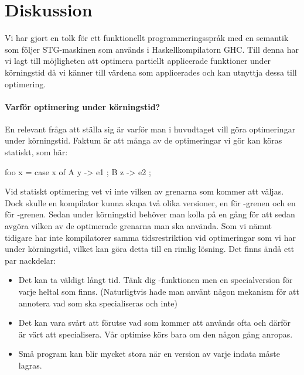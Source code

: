 \documentclass[Rapport]{subfiles}
\begin{document}
\section{Diskussion}
    
Vi har gjort en tolk för ett funktionellt programmeringsspråk
med en semantik som följer STG-maskinen som används i Haskellkompilatorn GHC.
Till denna har vi lagt till möjligheten att optimera partiellt applicerade funktioner under körningstid
då vi känner till värdena som applicerades och kan utnyttja dessa till optimering.

\paragraph{Varför optimering under körningstid?}

En relevant fråga att ställa sig är varför man i huvudtaget vill göra optimeringar under körningstid. Faktum är att många av de optimeringar vi gör kan köras statiskt, som här:

\begin{codeEx}

foo x = case x of
        { A y  -> e1
        ; B z  -> e2
        };

\end{codeEx}

Vid statiskt optimering vet vi inte vilken av grenarna som kommer att väljas. Dock skulle en kompilator kunna skapa två olika versioner, en för -grenen och en för 
-grenen. Sedan under körningstid behöver man kolla på  en gång för att sedan avgöra vilken av de optimerade grenarna man ska använda.
Som vi nämnt tidigare har inte kompilatorer samma tidsrestriktion vid optimeringar som vi har under körningstid, vilket kan göra detta till en rimlig lösning. Det finns ändå ett par nackdelar:
\begin{itemize}
    \item Det kan ta väldigt långt tid. Tänk dig -funktionen men en specialversion för varje heltal som finns. (Naturligtvis hade man använt någon mekanism för att annotera vad som ska specialiseras och inte)
    \item Det kan vara svårt att förutse vad som kommer att används ofta och därför är värt att specialisera. Vår optimise körs bara om den någon gång anropas.
    \item Små program kan blir mycket stora när en version av varje indata måste lagras.
\end{itemize}
\end{document}
